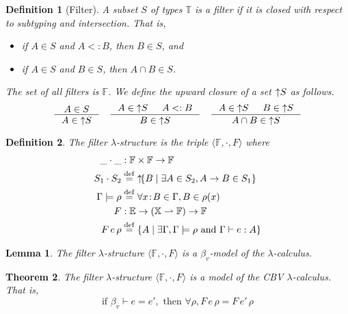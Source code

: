 \documentclass{tufte-handout}
\newcommand{\defeq}[0]{\overset{\mathrm{def}}{=}}
\newcommand{\of}[0]{\!:\!}
\newcommand{\pto}[0]{\rightharpoonup}
\newcommand{\VAR}[0]{\mathbb{X}}
\newtheorem{theorem}{Theorem}%
\newtheorem{lemma}[theorem]{Lemma}
\newtheorem{definition}{Definition}%
\begin{document}
\begin{definition}[Filter]
  A subset $S$ of types $\mathbb{T}$ is a \emph{filter} if it is
  closed with respect to subtyping and intersection. That is,
  \begin{itemize}
  \item if $A \in S$ and $A <: B$, then $B \in S$, and
  \item if $A \in S$ and $B \in S$, then $A \cap B \in S$.
  \end{itemize}
  The set of all filters is $\mathbb{F}$.
  We define the upward closure of a set $\mathop{\uparrow}\! S$ as follows.
  \begin{gather*}
    \inference{A \in S}
              {A \in \UP{S}} 
    \quad
    \inference{A \in \UP{S} & A <: B}
              {B \in \UP{S}}
    \quad
    \inference{A \in \UP{S} & B \in \UP{S}}
              {A \cap B \in \UP{S}}
  \end{gather*}
\end{definition}


\begin{definition}
  The \emph{filter $\lambda$-structure} is the triple $\langle
  \mathbb{F}, \cdot, F\rangle$ where
\begin{align*}
  \_ \cdot \_ & : \mathbb{F} \times \mathbb{F} \to \mathbb{F}\\
  S_1 \cdot S_2 &\defeq \UP{\{ B \mid \exists A \in S_2, A \to B \in S_1 \}}\\
  \Gamma \models \rho &\defeq \forall x\of B \in \Gamma, B \in \rho(x) \\
  F &: \mathbb{E} \to (\VAR \pto \mathbb{F}) \to \mathbb{F}\\
  F\,e\,\rho &\defeq \{ A \mid \exists \Gamma, \Gamma \models \rho \text{ and } \Gamma \vdash e : A\} 
\end{align*}
\end{definition}


\begin{lemma}
  The filter $\lambda$-structure $\langle \mathbb{F}, \cdot, F\rangle$
  is a $\beta_v$-model of the $\lambda$-calculus.
\end{lemma}

\begin{theorem}
  The filter $\lambda$-structure $\langle \mathbb{F}, \cdot, F\rangle$
  is a model of the CBV $\lambda$-calculus. That is,
  \[
  \text{if } \beta_v \vdash e = e', 
  \text{ then } \forall \rho, F\,e\,\rho = F\,e'\,\rho
  \]
\end{theorem}
\end{document}
